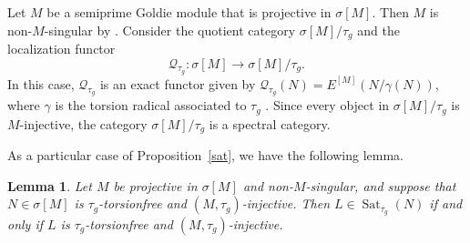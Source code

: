 \documentclass{amsart}
\newtheorem{thm}{Theorem}[section]
\newtheorem{lemma}[thm]{Lemma}
\theoremstyle{definition}
\theoremstyle{remark}
\numberwithin{equation}{section}
\DeclareMathOperator{\Hom}{Hom}
\DeclareMathOperator{\End}{End}
\DeclareMathOperator{\Sat}{Sat}
\newcommand{\sm}{\sigma[M]}
\newcommand{\dleq}{\leq^\oplus}
\begin{document}
	Let $M$ be a semiprime Goldie module that is projective in $\sm$. Then $M$ is non-$M$-singular by \cite[Theorem 2.8]{maugoldie}. 
	Consider the quotient category $\sm/\tau_g$ and the localization functor
	\[\mathcal{Q}_{\tau_g}:\sm\to \sm/\tau_g.\]
	In this case, $\mathcal{Q}_{\tau_g}$ is an exact functor 
	given by $\mathcal{Q}_{\tau_g}(N)=E^{[M]}(N/\gamma(N))$,
	where $\gamma$ is the torsion radical 
	associated to $\tau_g$ \cite[9.13, 10.5]{wisbauermodules}. 
	Since every object in $\sm/\tau_g$ is $M$-injective, 
	the category $\sm/\tau_g$ is a spectral category. 
	
	As a particular case of Proposition~\ref{sat}, 
	we have the following lemma.
	
	\begin{lemma}\label{sattg}
		Let $M$ be projective in $\sm$ and non-$M$-singular, 
		and suppose that $N\in\sm$ is $\tau_g$-torsionfree and $(M,\tau_g)$-injective. 
		Then $L\in\Sat_{\tau_g}(N)$ if and only if 
		$L$ is $\tau_g$-torsionfree and $(M,\tau_g)$-injective.
	\end{lemma}
	
	
%	
	
\end{document}
